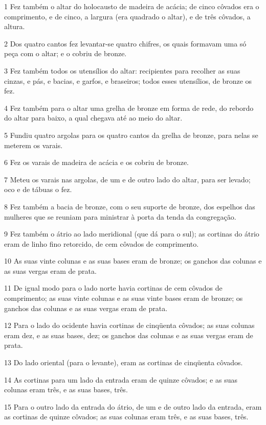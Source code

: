\par 1 Fez também o altar do holocausto de madeira de acácia; de cinco côvados era o comprimento, e de cinco, a largura (era quadrado o altar), e de três côvados, a altura.
\par 2 Dos quatro cantos fez levantar-se quatro chifres, os quais formavam uma só peça com o altar; e o cobriu de bronze.
\par 3 Fez também todos os utensílios do altar: recipientes para recolher as suas cinzas, e pás, e bacias, e garfos, e braseiros; todos esses utensílios, de bronze os fez.
\par 4 Fez também para o altar uma grelha de bronze em forma de rede, do rebordo do altar para baixo, a qual chegava até ao meio do altar.
\par 5 Fundiu quatro argolas para os quatro cantos da grelha de bronze, para nelas se meterem os varais.
\par 6 Fez os varais de madeira de acácia e os cobriu de bronze.
\par 7 Meteu os varais nas argolas, de um e de outro lado do altar, para ser levado; oco e de tábuas o fez.
\par 8 Fez também a bacia de bronze, com o seu suporte de bronze, dos espelhos das mulheres que se reuniam para ministrar à porta da tenda da congregação.
\par 9 Fez também o átrio ao lado meridional (que dá para o sul); as cortinas do átrio eram de linho fino retorcido, de cem côvados de comprimento.
\par 10 As suas vinte colunas e as suas bases eram de bronze; os ganchos das colunas e as suas vergas eram de prata.
\par 11 De igual modo para o lado norte havia cortinas de cem côvados de comprimento; as suas vinte colunas e as suas vinte bases eram de bronze; os ganchos das colunas e as suas vergas eram de prata.
\par 12 Para o lado do ocidente havia cortinas de cinqüenta côvados; as suas colunas eram dez, e as suas bases, dez; os ganchos das colunas e as suas vergas eram de prata.
\par 13 Do lado oriental (para o levante), eram as cortinas de cinqüenta côvados.
\par 14 As cortinas para um lado da entrada eram de quinze côvados; e as suas colunas eram três, e as suas bases, três.
\par 15 Para o outro lado da entrada do átrio, de um e de outro lado da entrada, eram as cortinas de quinze côvados; as suas colunas eram três, e as suas bases, três.
